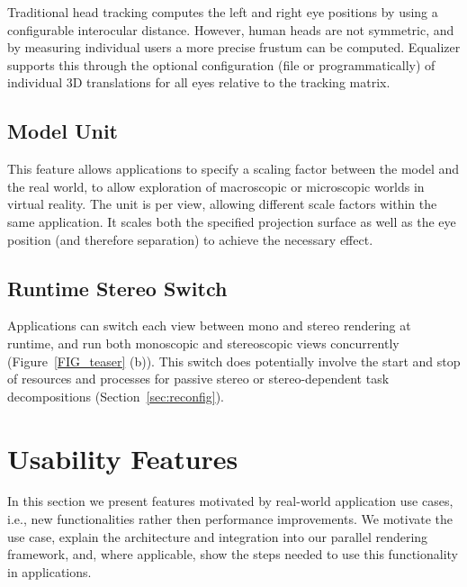 \documentclass[10pt,journal,compsoc]{IEEEtran}
\newcommand{\sref}[1]{Section~\ref{#1}}
\newcommand{\fig}[1]{Figure~\ref{#1}}
\begin{document}
Traditional head tracking computes the left and right eye positions by using a
configurable interocular distance. However, human heads are not symmetric, and
by measuring individual users a more precise frustum can be computed.
\textsf{Equalizer} supports this through the optional configuration (file or
programmatically) of individual 3D translations for all eyes relative to the
tracking matrix.

\subsection{Model Unit}

This feature allows applications to specify a scaling factor between the model
and the real world, to allow exploration of macroscopic or microscopic worlds in
virtual reality. The unit is per view, allowing different scale factors within
the same application. It scales both the specified projection surface as well
as the eye position (and therefore separation) to achieve the necessary effect.

\subsection{Runtime Stereo Switch}

Applications can switch each view between mono and stereo rendering at runtime,
and run both monoscopic and stereoscopic views concurrently (\fig{FIG_teaser}
(b)). This switch does potentially involve the start and stop of resources and
processes for passive stereo or stereo-dependent task decompositions
(\sref{sec:reconfig}).

\section{Usability Features}

In this section we present features motivated by real-world application use
cases, i.e., new functionalities rather then performance improvements. We
motivate the use case, explain the architecture and integration into our
parallel rendering framework, and, where applicable, show the steps needed to
use this functionality in applications.
\end{document}
